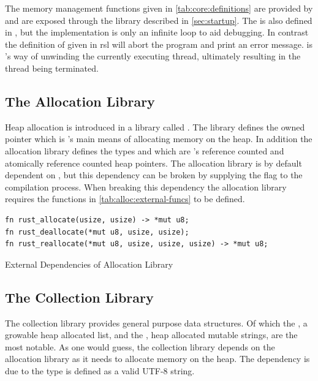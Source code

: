 The memory management functions given in \autoref{tab:core:definitions} are provided by  and are exposed through the  library described in \autoref{sec:startup}.
The  is also defined in , but the implementation is only an infinite loop to aid debugging.
In contrast the definition of  given in \gls{rsl} will abort the program and print an error message.
 is {\rust}'s way of unwinding the currently executing thread, ultimately resulting in the thread being terminated.

\subsection{The Allocation Library}
\label{sec:rust:allocation}

Heap allocation is introduced in a library called .
The library defines the owned pointer  which is {\rust}'s main means of allocating memory on the heap.
In addition the allocation library defines the types  and  which are {\rust}'s reference counted and atomically reference counted heap pointers.
The allocation library is by default dependent on , but this dependency can be broken by supplying the  flag to the compilation process.
When breaking this dependency the allocation library requires the functions in \autoref{tab:alloc:external-funcs} to be defined.

\begin{listing}[H]
  \begin{verbatim}
fn rust_allocate(usize, usize) -> *mut u8;
fn rust_deallocate(*mut u8, usize, usize);
fn rust_reallocate(*mut u8, usize, usize, usize) -> *mut u8;
  \end{verbatim}
  \caption{External Dependencies of Allocation Library}
  \label{tab:alloc:external-funcs}
\end{listing}

\subsection{The Collection Library}

The {\rust} collection library provides general purpose data structures.
Of which the , a growable heap allocated list, and the , heap allocated mutable strings, are the most notable.
As one would guess, the collection library depends on the allocation library as it needs to allocate memory on the heap.
The  dependency is due to the  type is defined as a valid UTF-8 string.
